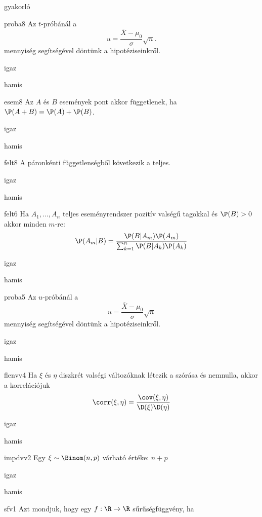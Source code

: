 \documentclass[12pt]{article}
\begin{document}
\begin{quiz}{gyakorló}
\begin{multi}[feedback={A fenti formula a $u$-próba ún. próbastatisztikája.}]{proba8}
Az $t$-próbánál a 
$$
u=\frac{\overline{X}-\mu_0}{\sigma}\sqrt{n}.
$$
mennyiség segítségével döntünk a hipotéziseinkről.
\item igaz
\item* hamis
\end{multi}
\begin{multi}[feedback={Definíció.}]{esem8}
Az $A$ és $B$ események pont akkor függetlenek, ha $\P(A+B)=\P(A)+\P(B)$.
\item igaz
\item* hamis
\end{multi}
\begin{multi}[feedback={A páronkénti gyengébb tulajdonság.}]{felt8}
A páronkénti függetlenségből következik a teljes.
\item igaz
\item* hamis
\end{multi}
\begin{multi}[feedback={Bayes-tétel}]{felt6}
Ha $A_1,\ldots,A_n$ teljes eseményrendszer pozitív valségű tagokkal és $\P(B)>0$ akkor minden $m$-re:
$$
\P(A_m|B)=\frac{\P(B|A_m)\P(A_m)}{\sum_{k=1}^n \P(B|A_k)\P(A_k)}
$$
\item* igaz
\item hamis
\end{multi}
\begin{multi}[feedback={A fenti formula az $u$-próba ún. próbastatisztikája.}]{proba5}
Az $u$-próbánál a 
$$
u=\frac{\overline{X}-\mu_0}{\sigma}\sqrt{n}
$$
mennyiség segítségével döntünk a hipotéziseinkről.
\item* igaz
\item hamis
\end{multi}
\begin{multi}[feedback={Def.}]{flenvv4}
Ha $\xi$ és $\eta$ diszkrét valségi változóknak létezik a szórása és nemnulla, akkor a 
korrelációjuk
$$
\corr(\xi,\eta)=\frac{\cov(\xi,\eta)}{\D(\xi)\D(\eta)}
$$
\item* igaz
\item hamis
\end{multi}
\begin{multi}[feedback={$\xi=\xi_1+\ldots+\xi_n$, ahol $\xi_k$ Bernoulli és $\E(\xi_k)=p$+$\E$-additívitása}]{impdvv2}
Egy $\xi\sim \Binom(n,p)$ várható értéke: $n+p$
\item igaz
\item* hamis
\end{multi}
\begin{multi}[feedback={Def.}]{sfv1}
Azt mondjuk, hogy egy $f:\R\to \R$ sűrűségfüggvény, ha 

\end{multi}
\end{quiz}
\end{document}
